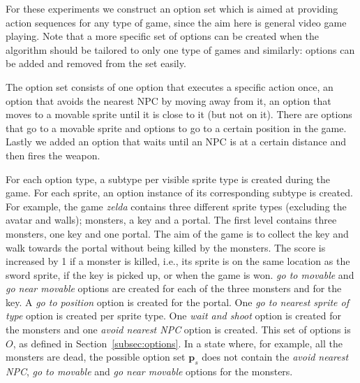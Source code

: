 For these experiments we construct an option set which is aimed at providing
action sequences for any type of game, since the aim here is general video game
playing. Note that a more specific set of options can be created when the
algorithm should be tailored to only one type of games and similarly: options
can be added and removed from the set easily.

The option set consists of one option that executes a specific action once, an
option that avoids the nearest NPC by moving away from it, an option that moves
to a movable sprite until it is close to it (but not on it). There are options
that go to a movable sprite and options to go to a certain position in the game.
Lastly we added an option that waits until an NPC is at a certain distance and
then fires the weapon.

For each option type, a subtype per visible sprite type is created during the
game. For each sprite, an option instance of its corresponding subtype is
created. For example, the game \textit{zelda} contains three different sprite
types (excluding the avatar and walls); monsters, a key and a portal. The first
level contains three monsters, one key and one portal. The aim of the game is to
collect the key and walk towards the portal without being killed by the
monsters. The score is increased by 1 if a monster is killed, i.e., its sprite
is on the same location as the sword sprite, if the key is picked up, or when
the game is won.  \emph{go to movable} and \emph{go near movable} options are
created for each of the three monsters and for the key. A \emph{go to position}
option is created for the portal.  One \emph{go to nearest sprite of type}
option is created per sprite type. One \emph{wait and shoot} option is created
for the monsters and one \emph{avoid nearest NPC} option is created. This set of
options is $O$, as defined in Section~\ref{subsec:options}. In a state where,
for example, all the monsters are dead, the possible option set $\mathbf{p}_s$
does not contain the \emph{avoid nearest NPC}, \emph{go to movable} and \emph{go
near movable} options for the monsters.

